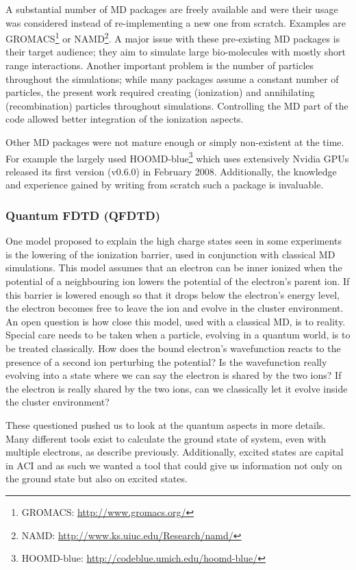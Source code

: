 A substantial number of MD packages are freely available and were
their usage was considered instead of re-implementing a new one from scratch.
Examples are GROMACS\footnote{GROMACS:
\url{http://www.gromacs.org/}} or NAMD\footnote{NAMD:
\url{http://www.ks.uiuc.edu/Research/namd/}}. A major issue with these
pre-existing MD packages is their target audience; they aim to simulate large
bio-molecules with mostly short range interactions. Another important problem
is the number of particles throughout the simulations; while many packages
assume a constant number of particles, the present work required creating
(ionization) and annihilating (recombination) particles throughout simulations.
Controlling the MD part of the code allowed better integration of the
ionization aspects.

Other MD packages were not mature enough or simply non-existent at the time.
For example the largely used HOOMD-blue\footnote{HOOMD-blue:
\url{http://codeblue.umich.edu/hoomd-blue/}} which uses extensively
Nvidia GPUs released its first version (v0.6.0) in February 2008.
Additionally, the knowledge and experience gained by writing from scratch such
a package is invaluable.






\subsubsection{Quantum FDTD (QFDTD)}
One model proposed to explain the high charge states seen in some experiments
is the lowering of the ionization barrier, used in conjunction with classical
MD simulations. This model assumes that an electron can be inner ionized when
the potential of a neighbouring ion lowers the potential of the electron's
parent ion. If this barrier is lowered enough so that it drops below the
electron's energy level, the electron becomes free to leave the ion and evolve
in the cluster environment. An open question is how close this model, used
with a classical MD, is to reality. Special care needs to be taken when a
particle, evolving in a quantum world, is to be treated classically. How does
the bound electron's wavefunction reacts to the presence of a second ion
perturbing the potential? Is the wavefunction really evolving into a state
where we can say the electron is shared by the two ions? If the electron is
really shared by the two ions, can we classically let it evolve inside the
cluster environment?

These questioned pushed us to look at the quantum aspects in more details. Many
different tools exist to calculate the ground state of system, even with
multiple electrons, as describe previously. Additionally, excited states are
capital in ACI and as such we wanted a tool that could give us information not
only on the ground state but also on excited states.


